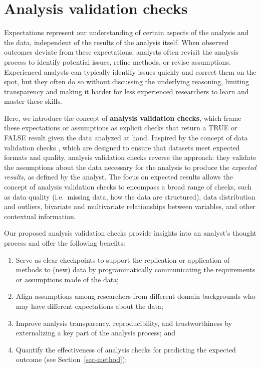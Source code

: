 \documentclass[
  12pt,
]{interact}
\providecommand{\tightlist}{%
  \setlength{\itemsep}{0pt}\setlength{\parskip}{0pt}}\usepackage{longtable,booktabs,array}
\begin{document}
\section{Analysis validation checks}\label{sec-plan}

Expectations represent our understanding of certain aspects of the
analysis and the data, independent of the results of the analysis
itself. When observed outcomes deviate from these expectations, analysts
often revisit the analysis process to identify potential issues, refine
methods, or revise assumptions. Experienced analysts can typically
identify issues quickly and correct them on the spot, but they often do
so without discussing the underlying reasoning, limiting transparency
and making it harder for less experienced researchers to learn and
master these skills.

Here, we introduce the concept of \textbf{analysis validation checks},
which frame these expectations or assumptions as explicit checks that
return a TRUE or FALSE result given the data analyzed at hand. Inspired
by the concept of data validation checks \citep{validate}, which are
designed to ensure that datasets meet expected formats and quality,
analysis validation checks reverse the approach: they validate the
assumptions about the data necessary for the analysis to produce the
\emph{expected results}, as defined by the analyst. The focus on
expected results allows the concept of analysis validation checks to
encompass a broad range of checks, such as data quality (i.e.~missing
data, how the data are structured), data distribution and outliers,
bivariate and multivariate relationships between variables, and other
contextual information.

Our proposed analysis validation checks provide insights into an
analyst's thought process and offer the following benefits:

\begin{enumerate}
\def\labelenumi{\arabic{enumi}.}
\tightlist
\item
  Serve as clear checkpoints to support the replication or application
  of methods to (new) data by programmatically communicating the
  requirements or assumptions made of the data;
\item
  Align assumptions among researchers from different domain backgrounds
  who may have different expectations about the data;
\item
  Improve analysis transparency, reproducibility, and trustworthiness by
  externalizing a key part of the analysis process; and
\item
  Quantify the effectiveness of analysis checks for predicting the
  expected outcome (see Section~\ref{sec-method});
\end{enumerate}
\end{document}
